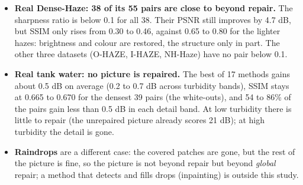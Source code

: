 \documentclass[10pt,a4paper]{article}
\begin{document}
\begin{itemize}
\item \textbf{Real Dense-Haze: 38 of its 55 pairs are close to beyond repair.} The sharpness ratio is below 0.1 for all 38. Their PSNR still improves by 4.7 dB, but SSIM only rises from 0.30 to 0.46, against 0.65 to 0.80 for the lighter hazes: brightness and colour are restored, the structure only in part. The other three datasets (O-HAZE, I-HAZE, NH-Haze) have no pair below 0.1.
\item \textbf{Real tank water: no picture is repaired.} The best of 17 methods gains about 0.5 dB on average (0.2 to 0.7 dB across turbidity bands), SSIM stays at 0.665 to 0.670 for the densest 39 pairs (the white-outs), and 54 to 86\% of the pairs gain less than 0.5 dB in each detail band. At low turbidity there is little to repair (the unrepaired picture already scores 21 dB); at high turbidity the detail is gone.
\item \textbf{Raindrops} are a different case: the covered patches are gone, but the rest of the picture is fine, so the picture is not beyond repair but beyond \emph{global} repair; a method that detects and fills drops (inpainting) is outside this study.
\end{itemize}
\end{document}
